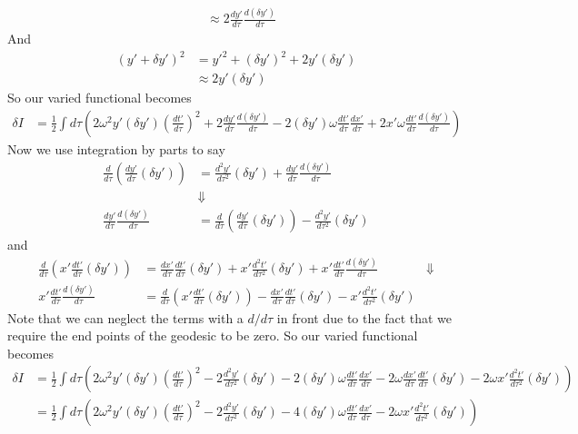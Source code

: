 \documentclass[11pt]{article}
\numberwithin{equation}{section}
\begin{document}
\begin{enumerate}[(a)]
\begin{align*}
&\approx 2\frac{dy'}{d\tau}\frac{d(\delta y')}{d\tau}
\end{align*}
And
\begin{align*}
(y'+\delta y')^2 &= y'^2 + (\delta y')^2 + 2y'(\delta y')\\
&\approx 2y'(\delta y')
\end{align*}
So our varied functional becomes
\begin{align*}
\delta I &= \frac{1}{2}\int d\tau \left(2\omega^2y'(\delta y')\left(\frac{dt'}{d\tau}\right)^2  +  2\frac{dy'}{d\tau}\frac{d(\delta y')}{d\tau} - 2(\delta y')\omega\frac{dt'}{d\tau}\frac{dx'}{d\tau} + 2x'\omega \frac{dt'}{d\tau}\frac{d(\delta y')}{d\tau}\right)
\end{align*}
Now we use integration by parts to say 
\begin{align*}
\frac{d}{d\tau}\left(\frac{dy'}{d\tau}(\delta y')\right) &= \frac{d^2y'}{d\tau^2}(\delta y') + \frac{dy'}{d\tau}\frac{d(\delta y')}{d\tau}\\
&\Downarrow\\
\frac{dy'}{d\tau}\frac{d(\delta y')}{d\tau} &= \frac{d}{d\tau}\left(\frac{dy'}{d\tau}(\delta y')\right) - \frac{d^2y'}{d\tau^2}(\delta y')
\end{align*}
and
\begin{align*}
\frac{d}{d\tau}\left(x'\frac{dt'}{d\tau}(\delta y')\right) &= \frac{dx'}{d\tau}\frac{dt'}{d\tau}(\delta y') + x'\frac{d^2t'}{d\tau^2}(\delta y') + x'\frac{dt'}{d\tau}\frac{d(\delta y')}{d\tau}
&\Downarrow\\
x'\frac{dt'}{d\tau}\frac{d(\delta y')}{d\tau} &= \frac{d}{d\tau}\left(x'\frac{dt'}{d\tau}(\delta y')\right) - \frac{dx'}{d\tau}\frac{dt'}{d\tau}(\delta y') - x'\frac{d^2t'}{d\tau^2}(\delta y') 
\end{align*}
Note that we can neglect the terms with a $d/d\tau$ in front due to the fact that we require the end points of the geodesic to be zero. So our varied functional becomes
\begin{align*}
\delta I &= \frac{1}{2}\int d\tau \left(2\omega^2y'(\delta y')\left(\frac{dt'}{d\tau}\right)^2  -  2\frac{d^2y'}{d\tau^2}(\delta y') - 2(\delta y')\omega\frac{dt'}{d\tau}\frac{dx'}{d\tau}  - 2\omega\frac{dx'}{d\tau}\frac{dt'}{d\tau}(\delta y') - 2\omega x'\frac{d^2t'}{d\tau^2}(\delta y') \right)\\
&= \frac{1}{2}\int d\tau \left(2\omega^2y'(\delta y')\left(\frac{dt'}{d\tau}\right)^2  -  2\frac{d^2y'}{d\tau^2}(\delta y') - 4(\delta y')\omega\frac{dt'}{d\tau}\frac{dx'}{d\tau}   - 2\omega x'\frac{d^2t'}{d\tau^2}(\delta y') \right)\\

\end{align*}
\end{enumerate}
\end{document}
